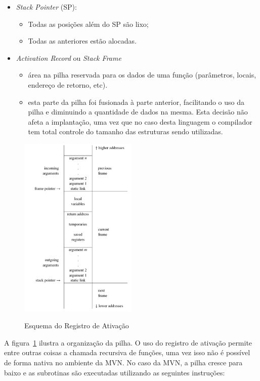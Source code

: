 \begin{itemize}
	\item \emph{Stack Pointer} (SP):
	\begin{itemize}
		\item Todas as posições além do SP são lixo;
		\item Todas as anteriores estão alocadas.
	\end{itemize}
	
	\item \emph{Activation Record} ou \emph{Stack Frame}
	\begin{itemize}
		\item área na pilha reservada para os dados de uma função (parâmetros, locais, endereço de retorno, etc).
                \item esta parte da pilha foi fusionada à parte anterior,
                    facilitando o uso da pilha e diminuindo a quantidade de
                    dados na mesma. Esta decisão não afeta a implantação, uma
                    vez que no caso desta linguagem o compilador tem total
                    controle do tamanho das estruturas sendo utilizadas. 
	\end{itemize}
\end{itemize}

\begin{figure}[ht]
	\centering
	\caption{Esquema do Registro de Ativação}
	\includegraphics[width=0.5\textwidth]{images/registros-ativacao.png}
	\label{fig:registros-ativacao}
\end{figure}

A figura~\ref{fig:registros-ativacao} ilustra a organização da pilha. O uso do registro de ativação permite entre outras coisas a chamada recursiva de funções, uma vez isso não é possível de forma nativa no ambiente da MVN. No caso da MVN, a pilha cresce para baixo e as subrotinas são executadas utilizando as seguintes instruções:

